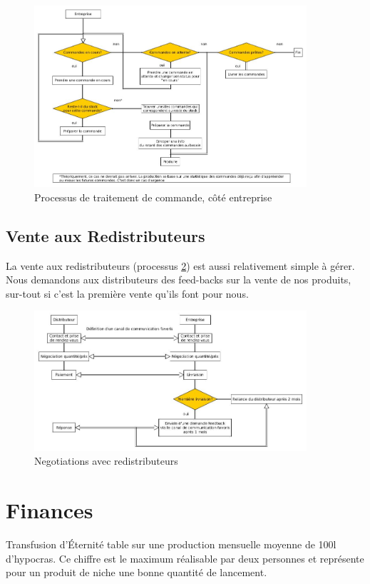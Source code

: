 \documentclass[10pt,a4paper]{article}
\newcommand{\tde}{Transfusion d'Éternité}
\begin{document}
\begin{figure}[h!]
\centering
\includegraphics[width=0.9\textwidth]{../flowchart/commande.jpg}
\caption{Processus de traitement de commande, côté entreprise}
\label{cmdUsine}
\end{figure}
\clearpage
\subsection{Vente aux Redistributeurs}
La vente aux redistributeurs (processus \ref{redist}) est aussi relativement simple à gérer.
Nous demandons aux distributeurs des feed-backs sur la vente de nos produits, sur-tout si c'est la première vente qu'ils font pour nous.

\begin{figure}[h!]
\centering
\includegraphics[width=0.9\textwidth]{../flowchart/distributeur.jpg}
\caption{Negotiations avec redistributeurs}
\label{redist}
\end{figure}

\clearpage
\section{Finances}
\tde{} table sur une production mensuelle moyenne de 100l d'hypocras.
Ce chiffre est le maximum réalisable par deux personnes et représente pour un produit de niche une bonne quantité de lancement.
\end{document}
